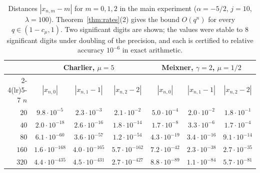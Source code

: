 \begin{table}[!htbp]
\centering
\small
\caption{Distances $|x_{n,m}-m|$ for $m=0,1,2$ in the main experiment ($\alpha=-5/2$, $j=10$, $\lambda=100$). Theorem~\ref{thm:rates}(2) gives the bound $O(q^{n})$ for every $q\in(1-c_\mu,1)$. Two significant digits are shown; the values were stable to $8$ significant digits under doubling of the precision, and each is certified to relative accuracy $10^{-6}$ in exact arithmetic.}
\label{tab:integer}
\renewcommand{\arraystretch}{1.15}
\begin{tabular}{rcccccc}
\toprule
& \multicolumn{3}{c}{Charlier, $\mu=5$} & \multicolumn{3}{c}{Meixner, $\gamma=2$, $\mu=1/2$}\\
\cmidrule(lr){2-4}\cmidrule(lr){5-7}
$n$ & $|x_{n,0}|$ & $|x_{n,1}-1|$ & $|x_{n,2}-2|$ & $|x_{n,0}|$ & $|x_{n,1}-1|$ & $|x_{n,2}-2|$\\
\midrule
$20$ & $9.8\cdot10^{-5}$ & $2.3\cdot10^{-3}$ & $2.1\cdot10^{-2}$ & $5.0\cdot10^{-4}$ & $2.0\cdot10^{-2}$ & $1.8\cdot10^{-1}$\\
$40$ & $2.0\cdot10^{-18}$ & $2.6\cdot10^{-16}$ & $1.8\cdot10^{-14}$ & $1.7\cdot10^{-8}$ & $3.3\cdot10^{-6}$ & $1.7\cdot10^{-4}$\\
$80$ & $6.1\cdot10^{-60}$ & $3.6\cdot10^{-57}$ & $1.2\cdot10^{-54}$ & $4.3\cdot10^{-19}$ & $3.4\cdot10^{-16}$ & $9.1\cdot10^{-14}$\\
$160$ & $1.6\cdot10^{-168}$ & $4.0\cdot10^{-165}$ & $5.7\cdot10^{-162}$ & $7.2\cdot10^{-42}$ & $2.3\cdot10^{-38}$ & $2.7\cdot10^{-35}$\\
$320$ & $4.4\cdot10^{-435}$ & $4.5\cdot10^{-431}$ & $2.7\cdot10^{-427}$ & $8.8\cdot10^{-89}$ & $1.1\cdot10^{-84}$ & $5.7\cdot10^{-81}$\\
\bottomrule
\end{tabular}
\end{table}
